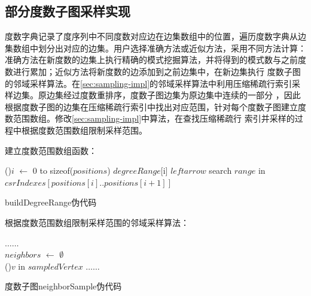 \documentclass[master]{thesis-uestc}
\begin{document}
\subsection{部分度数子图采样实现}
\label{subsec:fit-sample}
    度数字典记录了度序列中不同度数对应边在边集数组中的位置，遍历度数字典从边集数组中划分出对应的边集。用户选择准确方法或近似方法，采用不同方法计算：
准确方法在新度数的边集上执行精确的模式挖掘算法，并将得到的模式数与之前度数进行累加；近似方法将新度数的边添加到之前边集中，在新边集执行
度数子图的邻域采样算法。在\ref{sec:sampling-impl}的邻域采样算法中利用压缩稀疏行索引采样边集。原边集经过度数重排序，度数子图边集为原边集中连续的一部分
，因此根据度数子图的边集在压缩稀疏行索引中找出对应范围，针对每个度数子图建立度数范围数组。修改\ref{sec:sampling-impl}中算法，在查找压缩稀疏行
索引并采样的过程中根据度数范围数组限制采样范围。

\begin{table}
    \caption{部分度数子图采样主要数据结构}
    \label{tab:fit-samp-class}
\end{table}

    建立度数范围数组函数：

\begin{algorithm}

    \For(){$i$ $\leftarrow$ 0 to sizeof($positions$)}{
        $degreeRange$[i] $leftarrow$ search $range$ in $csrIndexes[positions[i]..positions[i+1]]$
    }
    \caption{buildDegreeRange伪代码}
    \label{alg:build-degree-range}
\end{algorithm}

    根据度数范围数组限制采样范围的邻域采样算法：

\begin{algorithm}[H]
    $\dots\dots$\\
    $neighbors$ $\leftarrow$ $\emptyset$\\
    \For(){$v$ in $sampledVertex$}{
    }
    $\dots\dots$\\
    \caption{度数子图neighborSample伪代码}
    \label{alg:nei-sample-range}
\end{algorithm}
\end{document}
